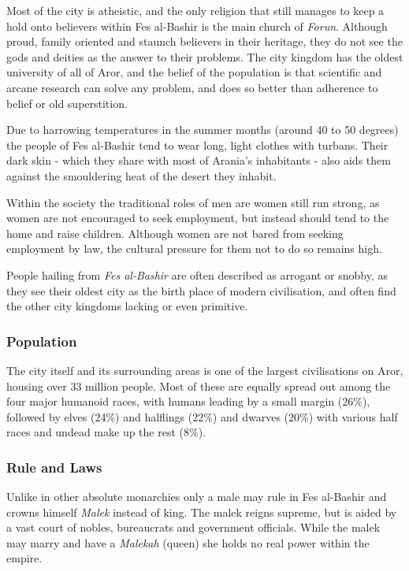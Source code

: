Most of the city is atheistic, and the only religion that still manages to
keep a hold onto believers within Fes al-Bashir is the main church of
\emph{Forun}. Although proud, family oriented and staunch believers in their
heritage, they do not see the gods and deities as the answer to their
problems. The city kingdom has the oldest university of all of Aror, and the
belief of the population is that scientific and arcane research can solve any
problem, and does so better than adherence to belief or old superstition.

Due to harrowing temperatures in the summer months (around 40 to 50 degrees)
the people of Fes al-Bashir tend to wear long, light clothes with
turbans. Their dark skin - which they share with most of Arania's inhabitants
- also aids them against the smouldering heat of the desert they inhabit.

Within the society the traditional roles of men are women still run strong, as
women are not encouraged to seek employment, but instead should tend to the
home and raise children. Although women are not bared from seeking employment
by law, the cultural pressure for them not to do so remains high.

People hailing from \emph{Fes al-Bashir} are often described as arrogant or
snobby, as they see their oldest city as the birth place of modern
civilisation, and often find the other city kingdoms lacking or even
primitive.

\subsubsection*{Population}

The city itself and its surrounding areas is one of the largest civilisations
on Aror, housing over 33 million people. Most of these are equally spread out
among the four major humanoid races, with humans leading by a small margin
(26\%), followed by elves (24\%) and halflings (22\%) and dwarves (20\%) with
various half races and undead make up the rest (8\%).

\subsubsection*{Rule and Laws}

Unlike in other absolute monarchies only a male may rule in Fes al-Bashir and
crowns himself \emph{Malek} instead of king. The malek reigns supreme, but is
aided by a vast court of nobles, bureaucrats and government officials. While
the malek may marry and have a \emph{Malekah} (queen) she holds no real power
within the empire.

